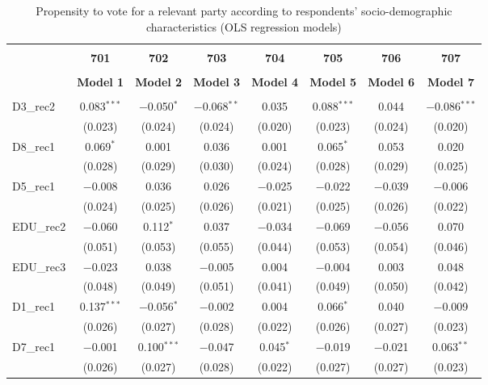 \documentclass[
]{article}
\begin{document}
\begin{table}[!htbp] \centering 
  \caption{Propensity to vote for a relevant party according to respondents' 
                     socio-demographic characteristics (OLS regression models)} 
  \label{table:full_ols_dk} 
\begin{tabular}{@{\extracolsep{5pt}}lccccccc} 
\\[-1.8ex]\hline \\[-1.8ex] 
 & \textbf{701} & \textbf{702} & \textbf{703} & \textbf{704} & \textbf{705} & \textbf{706} & \textbf{707} \\ 
\\[-1.8ex] & \textbf{Model 1} & \textbf{Model 2} & \textbf{Model 3} & \textbf{Model 4} & \textbf{Model 5} & \textbf{Model 6} & \textbf{Model 7}\\ 
\hline \\[-1.8ex] 
 D3\_rec2 & 0.083$^{***}$ & $-$0.050$^{*}$ & $-$0.068$^{**}$ & 0.035 & 0.088$^{***}$ & 0.044 & $-$0.086$^{***}$ \\ 
  & (0.023) & (0.024) & (0.024) & (0.020) & (0.023) & (0.024) & (0.020) \\ 
  D8\_rec1 & 0.069$^{*}$ & 0.001 & 0.036 & 0.001 & 0.065$^{*}$ & 0.053 & 0.020 \\ 
  & (0.028) & (0.029) & (0.030) & (0.024) & (0.028) & (0.029) & (0.025) \\ 
  D5\_rec1 & $-$0.008 & 0.036 & 0.026 & $-$0.025 & $-$0.022 & $-$0.039 & $-$0.006 \\ 
  & (0.024) & (0.025) & (0.026) & (0.021) & (0.025) & (0.026) & (0.022) \\ 
  EDU\_rec2 & $-$0.060 & 0.112$^{*}$ & 0.037 & $-$0.034 & $-$0.069 & $-$0.056 & 0.070 \\ 
  & (0.051) & (0.053) & (0.055) & (0.044) & (0.053) & (0.054) & (0.046) \\ 
  EDU\_rec3 & $-$0.023 & 0.038 & $-$0.005 & 0.004 & $-$0.004 & 0.003 & 0.048 \\ 
  & (0.048) & (0.049) & (0.051) & (0.041) & (0.049) & (0.050) & (0.042) \\ 
  D1\_rec1 & 0.137$^{***}$ & $-$0.056$^{*}$ & $-$0.002 & 0.004 & 0.066$^{*}$ & 0.040 & $-$0.009 \\ 
  & (0.026) & (0.027) & (0.028) & (0.022) & (0.026) & (0.027) & (0.023) \\ 
  D7\_rec1 & $-$0.001 & 0.100$^{***}$ & $-$0.047 & 0.045$^{*}$ & $-$0.019 & $-$0.021 & 0.063$^{**}$ \\ 
  & (0.026) & (0.027) & (0.028) & (0.022) & (0.027) & (0.027) & (0.023) \\ 

\end{tabular}
\end{table}
\end{document}
